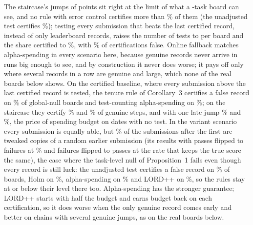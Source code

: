 \documentclass[11pt]{article}
\begin{document}
The staircase's jumps of \NumChainStep{} points sit right at the limit of what a \NumChainT{}-task board can see, and no rule with error control certifies more than \NumChainStairHolmPower\% of them (the unadjusted test certifies \NumChainStairUnadjPower\%); testing every submission that beats the last certified record, instead of only leaderboard records, raises the number of tests to \NumChainStairLordCertTests{} per board and the share certified to \NumChainStairLordCertPower\%, with \NumChainStairLordCertFdr\% of certifications false.
Online fallback matches alpha-spending in every scenario here, because genuine records never arrive in runs big enough to see, and by construction it never does worse; it pays off only where several records in a row are genuine and large, which none of the real boards below shows.
On the certified baseline, where every submission above the last certified record is tested, the tenure rule of Corollary~3 certifies a false record on \NumChainNullTenCertFwer\% of global-null boards and test-counting alpha-spending on \NumChainNullSpendCertFwer\%; on the staircase they certify \NumChainStairTenCertPower\% and \NumChainStairSpendCertPower\% of genuine steps, and with one late jump \NumChainLateTenCertPower\% and \NumChainLateSpendCertPower\%, the price of spending budget on dates with no test.
In the variant scenario every submission is equally able, but \NumChainVariantShare\% of the submissions after the first are tweaked copies of a random earlier submission (its results with passes flipped to failures at \NumChainVariantFlip\% and failures flipped to passes at the rate that keeps the true score the same), the case where the task-level null of Proposition~1 fails even though every record is still luck: the unadjusted test certifies a false record on \NumChainVariantUnadjFwer\% of boards, Holm on \NumChainVariantHolmFwer\%, alpha-spending on \NumChainVariantSpendFwer\% and LORD++ on \NumChainVariantLordFwer\%, so the rules stay at or below their level there too.
Alpha-spending has the stronger guarantee; LORD++ starts with half the budget and earns budget back on each certification, so it does worse when the only genuine record comes early and better on chains with several genuine jumps, as on the real boards below.

\begin{table}[t]
\centering\small
\resizebox{\textwidth}{!}{}
\caption{Certification rules on simulated \NumChainK{}-submission boards of \NumChainT{} tasks (fitted Verified difficulties and correlation, true score started at \NumChainBase\%). FWER: share of boards with at least one false certification. FDR: expected share of certified records that are false. Power: share of genuine record steps certified. Certified: mean number of certified records per board.}
\label{tab:chainsim}
\end{table}
\end{document}

